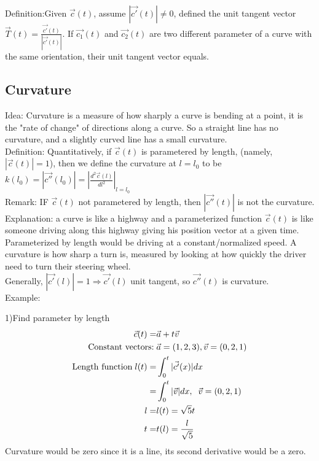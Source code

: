 \documentclass{article}
\begin{document}
        Definition:Given $\vec{c}(t)$, assume $|\vec{c'}(t)|\neq0$, defined the unit tangent vector $\vec{T}(t) = \frac{\vec{c'}(t)}{|\vec{c'}(t)|}$. If $\vec{c_1}(t)$ and $\vec{c_2}(t)$ are two different parameter of a curve with the same orientation, their unit tangent vector equals.
    \subsection{Curvature}
        Idea: Curvature is a measure of how sharply a curve is bending at a point, it is the "rate of change" of directions along a curve. So a straight line has no curvature, and a slightly curved line has a small curvature.\\
        
        Definition: Quantitatively, if $\vec{c}(t)$ is parametered by length, (namely, $|\vec{c}(t)|=1$), then we define the curvature at $l=l_0$ to be $k(l_0)=|\vec{c''}(l_0)|=|\frac{d^2\vec{c}(l)}{dl^2}|_{l=l_0}$\\
        
        Remark: IF $\vec{c}(t)$ not parametered by length, then $|\vec{c''}(t)|$ is not the curvature.\\
        
        Explanation: a curve is like a highway and a parameterized function $\vec{c}(t)$ is like someone driving along this highway giving his position vector at a given time. Parameterized by length would be driving at a constant/normalized speed. A curvature is how sharp a turn is, measured by looking at how quickly the driver need to turn their steering wheel.\\
        
        Generally, $|\vec{c'}(l)| = 1\Rightarrow\vec{c'}(l)$ unit tangent, so $\vec{c''}(t)$ is curvature.\\
        
        Example:
        
        1)Find parameter by length
        \begin{align}
            \vec{c}(t) =& \vec{a} + t\vec{v}\\
            \text{Constant vectors:\;}& \vec{a} = (1,2,3),\vec{v}=(0,2,1)\nonumber\\
            \text{Length function\;}l(t) =& \int^{t}_{0}|\vec{c'}(x)|dx\\
            =& \int^{t}_{0} |\vec{v}|dx,\;\;\vec{v}=(0,2,1)\\
            l =& l(t) = \sqrt{5} t\\
            t =& t(l) = \frac{l}{\sqrt{5}}
        \end{align}
        Curvature would be zero since it is a line, its second derivative would be a zero.\\
        
\end{document}
